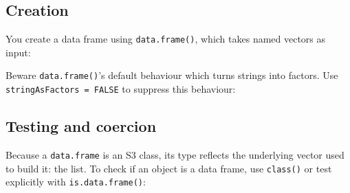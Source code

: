 \subsection{Creation}\label{creation}

You create a data frame using \texttt{data.frame()}, which takes named
vectors as input:

\begin{Shaded}
\begin{Highlighting}[]
\StringTok{ }\NormalTok{(} \NormalTok{:}\NormalTok{, } \NormalTok{(}\NormalTok{, }\NormalTok{, }\NormalTok{))}
\end{Highlighting}
\end{Shaded}

Beware \texttt{data.frame()}'s default behaviour which turns strings
into factors. Use \texttt{stringAsFactors = FALSE} to suppress this
behaviour:

\begin{Shaded}
\begin{Highlighting}[]
\StringTok{ }\NormalTok{(}
   \NormalTok{:}\NormalTok{,}
   \NormalTok{(}\NormalTok{, }\NormalTok{, }\NormalTok{),}
   \NormalTok{)}
\end{Highlighting}
\end{Shaded}

\subsection{Testing and coercion}\label{testing-and-coercion}

Because a \texttt{data.frame} is an S3 class, its type reflects the
underlying vector used to build it: the list. To check if an object is a
data frame, use \texttt{class()} or test explicitly with
\texttt{is.data.frame()}:

\begin{Shaded}
\begin{Highlighting}[]
\end{Highlighting}
\end{Shaded}

